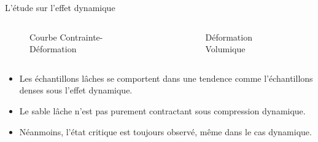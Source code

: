 \documentclass[10pt]{beamer}
\begin{document}
\begin{frame}{L'étude sur l'effet dynamique}
    \begin{columns}
        \begin{column}{0.5\textwidth}
            \begin{figure}[h]
                \centering
                \scalebox{0.5}{}
                \caption{Courbe Contrainte-Déformation}
            \end{figure}
        \end{column}


        \begin{column}{0.5\textwidth}
            \begin{figure}[h]
                \centering
                \scalebox{0.5}{}
                \caption{Déformation Volumique}
            \end{figure}
        \end{column}
    \end{columns}
    \begin{itemize}
        \item Les échantillons lâches se comportent dans une tendence comme l'échantillons denses sous l'effet dynamique.
        \item Le sable lâche n'est pas purement contractant sous compression dynamique.
        \item Néanmoins, l’état critique est toujours observé, même dans le cas dynamique.
    \end{itemize}
\end{frame}
\end{document}
